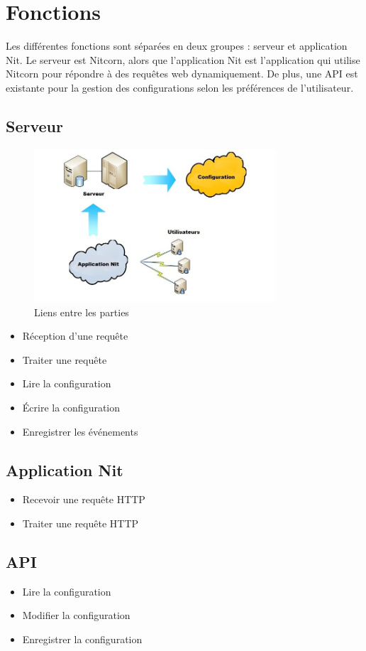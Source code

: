 \documentclass{scrreprt}
\begin{document}
\section{Fonctions}
Les différentes fonctions sont séparées en deux groupes : serveur et application Nit.
Le serveur est Nitcorn, alors que l'application Nit est l'application qui utilise
Nitcorn pour répondre à des requêtes web dynamiquement. De plus, une API est existante pour la gestion des configurations selon les préférences de l'utilisateur.\\

\subsection{Serveur}
\begin{figure}[ht!]
    \caption{Liens entre les parties}
    \centering
    \includegraphics[width=9cm]{diagram/diagram1}
\end{figure}

\begin{itemize}
 \item Réception d'une requête
 \item Traiter une requête
 \item Lire la configuration
 \item Écrire la configuration
 \item Enregistrer les événements
\end{itemize}
\subsection{Application Nit}
\begin{itemize}
 \item Recevoir une requête HTTP
 \item Traiter une requête HTTP
\end{itemize}
\subsection{API}
\begin{itemize}
 \item Lire la configuration
 \item Modifier la configuration
 \item Enregistrer la configuration
\end{itemize}
\end{document}
